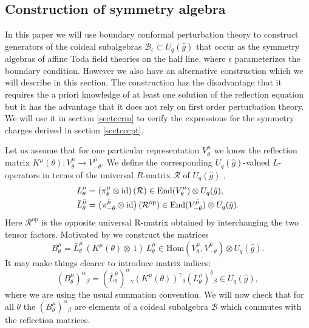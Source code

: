 \documentclass[a4paper,12pt]{article}
\newcommand{\End}{\text{End}}
\newcommand{\Hom}{\text{Hom}}
\newcommand{\uqgh}{U_q(\hat{g})}
\newcommand{\id}{\text{id}}
\newcommand{\mub}{\bar{\mu}}
\newcommand{\sa}{{\mathcal{B}}}
\newcommand{\ur}{{\mathcal R}}
\numberwithin{equation}{section}
\begin{document}
\subsection{Construction of symmetry algebra\label{sectcsa}}

In this paper we will use boundary conformal perturbation theory
to construct generators of the coideal subalgebras
$\sa_\epsilon\subset\uqgh$ that occur as the symmetry algebras of
affine Toda field theories on the half line, where $\epsilon$
parameterizes the boundary condition. However we also have an
alternative construction which we will describe in this section.
The construction has the disadvantage that it requires the a
priori knowledge of at least one solution of the reflection
equation but it has the advantage that it does not rely on first
order perturbation theory. We will use it in section
\ref{sectccrm} to verify the expressions for the symmetry charges
derived in section \ref{sectcccpt}.

Let us assume that for one particular representation
$V^\mu_\theta$ we know the reflection matrix
$K^\mu(\theta):V^\mu_\theta\rightarrow V^{\bar{\mu}}_{-\theta}$.
We define the corresponding $\uqgh$-valued $L$-operators
\cite{FRT} in terms of the universal $R$-matrix ${\mathcal R}$ of
$\uqgh$ \cite{Kho92},
\begin{align}
  L^\mu_\theta&=\left(\pi^\mu_\theta\otimes\id\right)
  ({\mathcal R})\in\End(V^\mu_\theta)\otimes\uqgh,\notag\\
  \bar{L}^{\bar{\mu}}_\theta&=
  \left(\pi^{\bar{\mu}}_{-\theta}\otimes\id\right)
  ({\mathcal R}^{\text{op}})\in\End(V^{\mub}_{-\theta})\otimes\uqgh.\label{l}
\end{align}
Here $\ur^{\text{op}}$ is the opposite universal R-matrix obtained
by interchanging the two tensor factors. Motivated by \cite{skl}
we construct the matrices
\begin{equation}\label{b}
  B^\mu_\theta=\bar{L}^{\bar{\mu}}_\theta\,
  (K^\mu(\theta)\otimes\,1)\,L^\mu_\theta\in
  \Hom(V^\mu_\theta,V^{\mub}_{-\theta})\otimes\uqgh.
\end{equation}
It may make things clearer to introduce matrix indices:
\begin{equation}
  (B^\mu_\theta)^\alpha{}_\beta=
  (\bar{L}^{\bar{\mu}}_\theta)^\alpha{}_\gamma
  (K^\mu(\theta))^\gamma{}_\delta(L^\mu_\theta)^\delta{}_\beta
  \in\uqgh,
\end{equation}
where we are using the usual summation convention.
We will now check that for all $\theta$ the
$(B^\mu_\theta)^\alpha{}_\beta$ are elements of a coideal
subalgebra $\sa$ which commutes with the reflection matrices.
\end{document}
